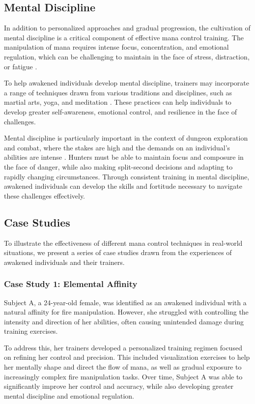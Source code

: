 \documentclass[12pt, a4paper]{article}
\begin{document}
\subsection{Mental Discipline}
In addition to personalized approaches and gradual progression, the cultivation of mental discipline is a critical component of effective mana control training. The manipulation of mana requires intense focus, concentration, and emotional regulation, which can be challenging to maintain in the face of stress, distraction, or fatigue \cite{Hofstede2027}.

To help awakened individuals develop mental discipline, trainers may incorporate a range of techniques drawn from various traditions and disciplines, such as martial arts, yoga, and meditation \cite{Choi2027}. These practices can help individuals to develop greater self-awareness, emotional control, and resilience in the face of challenges.

Mental discipline is particularly important in the context of dungeon exploration and combat, where the stakes are high and the demands on an individual's abilities are intense \cite{Kim2027}. Hunters must be able to maintain focus and composure in the face of danger, while also making split-second decisions and adapting to rapidly changing circumstances. Through consistent training in mental discipline, awakened individuals can develop the skills and fortitude necessary to navigate these challenges effectively.

\subsection{Case Studies}
To illustrate the effectiveness of different mana control techniques in real-world situations, we present a series of case studies drawn from the experiences of awakened individuals and their trainers.

\subsubsection{Case Study 1: Elemental Affinity}
Subject A, a 24-year-old female, was identified as an awakened individual with a natural affinity for fire manipulation. However, she struggled with controlling the intensity and direction of her abilities, often causing unintended damage during training exercises.

To address this, her trainers developed a personalized training regimen focused on refining her control and precision. This included visualization exercises to help her mentally shape and direct the flow of mana, as well as gradual exposure to increasingly complex fire manipulation tasks. Over time, Subject A was able to significantly improve her control and accuracy, while also developing greater mental discipline and emotional regulation.
\end{document}
